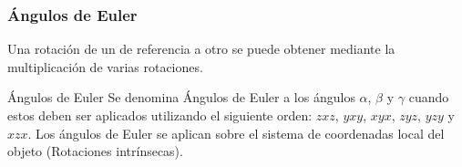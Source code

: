 \begin{frame}
    \frametitle{Ángulos de Euler}
    \scriptsize


    
    Una rotación de un de referencia a otro se puede obtener mediante la multiplicación de varias rotaciones.
    
    \begin{block}{Ángulos de Euler}
        Se denomina Ángulos de Euler a los ángulos $\alpha$, $\beta$ y $\gamma$ cuando estos deben ser aplicados utilizando el siguiente orden: $zxz$, $yxy$, $xyx$, $zyz$, $yzy$ y $xzx$. Los ángulos de Euler se aplican sobre el sistema de coordenadas local del objeto (Rotaciones intrínsecas).
    \end{block}
   

\end{frame}
